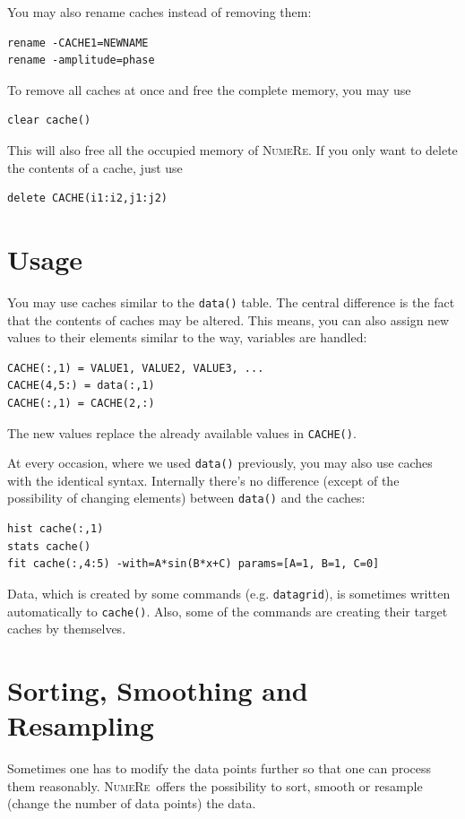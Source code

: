 \documentclass[DIV=14,headsepline,footsepline]{scrbook}
\newcommand{\NR}{\textsc{Nu\-me\-Re}}
\begin{document}
				You may also rename caches instead of removing them:
				\begin{lstlisting}
rename -CACHE1=NEWNAME
rename -amplitude=phase
				\end{lstlisting}
				
				To remove all caches at once and free the complete memory, you may use 
				\begin{lstlisting}
clear cache()
				\end{lstlisting}
				This will also free all the occupied memory of \NR. If you only want to delete the contents of a cache, just use 
				\begin{lstlisting}
delete CACHE(i1:i2,j1:j2)
				\end{lstlisting}
				
			\section{Usage}
				You may use caches similar to the \lstinline+data()+ table. The central difference is the fact that the contents of caches may be altered. This means, you can also assign new values to their elements similar to the way, variables are handled:
				\begin{lstlisting}
CACHE(:,1) = VALUE1, VALUE2, VALUE3, ...
CACHE(4,5:) = data(:,1)
CACHE(:,1) = CACHE(2,:)
				\end{lstlisting}
				The new values replace the already available values in \lstinline+CACHE()+.
				
				At every occasion, where we used \lstinline+data()+ previously, you may also use caches with the identical syntax. Internally there's no difference (except of the possibility of changing elements) between \lstinline+data()+ and the caches:
				\begin{lstlisting}
hist cache(:,1)
stats cache()
fit cache(:,4:5) -with=A*sin(B*x+C) params=[A=1, B=1, C=0]
				\end{lstlisting}
				
				Data, which is created by some commands (e.g. \lstinline+datagrid+), is sometimes written automatically to \lstinline+cache()+. Also, some of the commands are creating their target caches by themselves.
			\section{Sorting, Smoothing and Resampling}
				Sometimes one has to modify the data points further so that one can process them reasonably. \NR\ offers the possibility to sort, smooth or resample (change the number of data points) the data.
				
\end{document}
